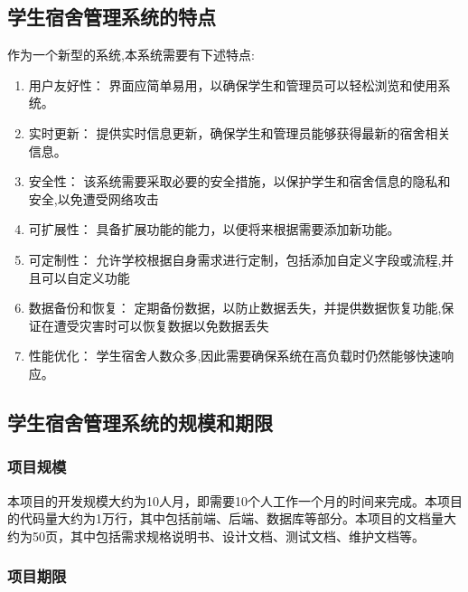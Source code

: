\documentclass[UTF-8]{ctexart}
\begin{document}
\subsection{学生宿舍管理系统的特点}
作为一个新型的系统,本系统需要有下述特点:
\begin{enumerate}
    \item 用户友好性： 界面应简单易用，以确保学生和管理员可以轻松浏览和使用系统。
    \item 实时更新： 提供实时信息更新，确保学生和管理员能够获得最新的宿舍相关信息。
    \item 安全性： 该系统需要采取必要的安全措施，以保护学生和宿舍信息的隐私和安全,以免遭受网络攻击
    \item 可扩展性： 具备扩展功能的能力，以便将来根据需要添加新功能。
    \item 可定制性： 允许学校根据自身需求进行定制，包括添加自定义字段或流程,并且可以自定义功能
    \item 数据备份和恢复： 定期备份数据，以防止数据丢失，并提供数据恢复功能,保证在遭受灾害时可以恢复数据以免数据丢失
    \item 性能优化： 学生宿舍人数众多,因此需要确保系统在高负载时仍然能够快速响应。
\end{enumerate}

\subsection{学生宿舍管理系统的规模和期限}

\subsubsection{项目规模}

本项目的开发规模大约为10人月，即需要10个人工作一个月的时间来完成。本项目的代码量大约为1万行，其中包括前端、后端、数据库等部分。本项目的文档量大约为50页，其中包括需求规格说明书、设计文档、测试文档、维护文档等。

\subsubsection{项目期限}
\end{document}
